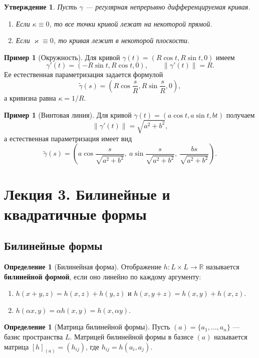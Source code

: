 \documentclass[12pt,a4paper]{article}
\newtheorem{proposition}[theorem]{Утверждение}
\theoremstyle{definition}
\newtheorem{definition}[theorem]{Определение}
\newtheorem{example}[theorem]{Пример}
\begin{document}
\begin{proposition}
Пусть $\gamma$ --- регулярная непрерывно дифференцируемая кривая.
\begin{enumerate}
    \item Если $\kappa \equiv 0$, то все точки кривой лежат на некоторой прямой.
    \item Если $\varkappa \equiv 0$, то кривая лежит в некоторой плоскости.
\end{enumerate}
\end{proposition}

\begin{example}[Окружность]
Для кривой $\gamma(t) = (R \cos t, R \sin t, 0)$ имеем
$$\gamma'(t) = (-R \sin t, R \cos t, 0), \qquad \|\gamma'(t)\| = R.$$
Ее естественная параметризация задается формулой
$$\tilde{\gamma}(s) = \left(R \cos \frac{s}{R}, R \sin \frac{s}{R}, 0\right),$$
а кривизна равна $\kappa = 1/R$.
\end{example}

\begin{example}[Винтовая линия]
Для кривой $\gamma(t) = (a \cos t, a \sin t, bt)$ получаем
$$\|\gamma'(t)\| = \sqrt{a^2 + b^2},$$
а естественная параметризация имеет вид
$$
\tilde{\gamma}(s) = \left(a \cos \frac{s}{\sqrt{a^2+b^2}},\ a \sin \frac{s}{\sqrt{a^2+b^2}},\ \frac{bs}{\sqrt{a^2+b^2}}\right).
$$
\end{example}

\section{Лекция 3. Билинейные и квадратичные формы}

\subsection{Билинейные формы}

\begin{definition}[Билинейная форма]
Отображение $h: L \times L \to \mathbb{R}$ называется \textbf{билинейной формой}, если оно линейно по каждому аргументу:
\begin{enumerate}
    \item $h(x+y, z) = h(x, z) + h(y, z)$ и $h(x, y+z) = h(x, y) + h(x, z)$.
    \item $h(\alpha x, y) = \alpha h(x, y) = h(x, \alpha y)$.
\end{enumerate}
\end{definition}

\begin{definition}[Матрица билинейной формы]
Пусть $(a) = \{a_1, \dots, a_n\}$ --- базис пространства $L$. Матрицей билинейной формы в базисе $(a)$ называется матрица $[h]_{(a)} = (h_{ij})$, где $h_{ij} = h(a_i, a_j)$.
\end{definition}
\end{document}
